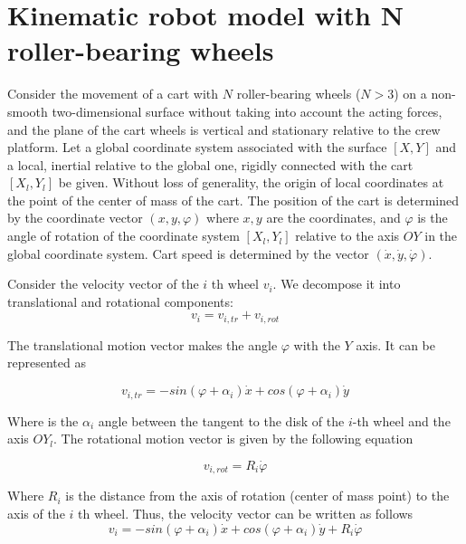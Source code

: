 \documentclass[oneside,final,14pt]{extreport}
\begin{document}
\chapter{Kinematic robot model with N roller-bearing wheels}   
Consider the movement of a cart with $ N $ roller-bearing wheels ($ N> 3 $) on a non-smooth two-dimensional surface without taking into account the acting forces, and the plane of the cart wheels is vertical and stationary relative to the crew platform. Let a global coordinate system associated with the surface $ [X, Y] $ and a local, inertial relative to the global one, rigidly connected with the cart $ [X_ {l}, Y_ {l}] $ be given. Without loss of generality, the origin of local coordinates at the point of the center of mass of the cart. The position of the cart is determined by the coordinate vector $ (x, y, \varphi) $
where $ x, y $ are the coordinates, and $ \varphi $ is the angle of rotation of the coordinate system $ [X_{l}, Y_{l}] $ relative to the axis $ OY $ in the global coordinate system. Cart speed is determined by the vector $ (\dot {x}, \dot {y}, \dot {\varphi}) $.

Consider the velocity vector of the $ i $ th wheel $ v_ {i} $. We decompose it into translational and rotational components:
\begin{equation}
v_{i}
=
v_{i,tr} + v_{i,rot}
\end{equation}
 
The translational motion vector makes the angle $ \varphi $ with the $ Y $ axis. It can be represented as

\begin{equation}
v_{i,tr} 
=
-sin(\varphi +\alpha_{i})\dot{x}
+cos(\varphi +\alpha_{i})\dot{y}
\end{equation}  

Where is the $ \alpha_ {i} $ angle between the tangent to the disk of the $ i $-th wheel and the axis $ OY_{l} $.
The rotational motion vector is given by the following equation

\begin{equation}
v_{i,rot}
=
R_{i}\dot{\varphi}
\end{equation}

Where $ R_ {i} $ is the distance from the axis of rotation (center of mass point) to the axis of the $ i $ th wheel. Thus, the velocity vector can be written as follows
\begin{equation}
v_{i}
=
-sin(\varphi +\alpha_{i})\dot{x}
+cos(\varphi +\alpha_{i})\dot{y}
+
R_{i}\dot{\varphi}
\end{equation}
\end{document}
